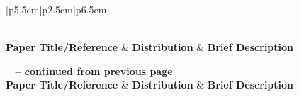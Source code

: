\begin{longtable}{|p{5.5cm}|p{2.5cm}|p{6.5cm}|}
	\caption{The test statistics used by the research articles for hypothesis testing}
	\label{tab:StatisticalProperties} \\
	\hline
	\textbf{Paper Title/Reference} & \textbf{Distribution} & \textbf{Brief Description} \\
	\hline
	\endfirsthead
	
	{{\bfseries \tablename\ \thetable{} -- continued from previous page}} \\
	\hline
	\textbf{Paper Title/Reference} & \textbf{Distribution} & \textbf{Brief Description} \\
	\hline
	\endhead
	
	\hline {} \\
	\endfoot
	
	\hline
	\endlastfoot
	

\end{longtable}
